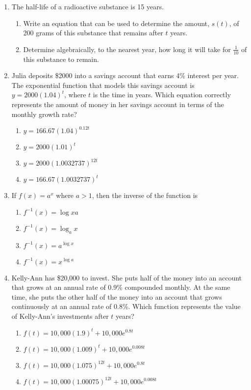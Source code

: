 \documentclass[12pt, twoside]{article}
\begin{document}
\begin{enumerate}[itemsep=0.5cm]
\item The half-life of a radioactive substance is 15 years.
\begin{enumerate}
    \item Write an equation that can be used to determine the amount, \( s(t) \), of 200 grams of this substance that remains after \( t \) years.
    \item Determine algebraically, to the nearest year, how long it will take for \(\frac{1}{10}\) of this substance to remain.
\end{enumerate}

\item Julia deposits \$2000 into a savings account that earns 4\% interest per year. The exponential function that models this savings account is \( y = 2000(1.04)^t \), where \( t \) is the time in years. Which equation correctly represents the amount of money in her savings account in terms of the monthly growth rate?
\begin{enumerate}
    \item \( y = 166.67(1.04)^{0.12t} \)
    \item \( y = 2000(1.01)^t \)
    \item \( y = 2000(1.0032737)^{12t} \)
    \item \( y = 166.67(1.0032737)^t \)
\end{enumerate}

\item If \( f(x) = a^x \) where \( a > 1 \), then the inverse of the function is
\begin{enumerate}
    \item \( f^{-1}(x) = \log x a \)
    \item \( f^{-1}(x) = \log_a x \)
    \item \( f^{-1}(x) = a^{\log x} \)
    \item \( f^{-1}(x) = x^{\log a} \)
\end{enumerate}

\item Kelly-Ann has \$20,000 to invest. She puts half of the money into an account that grows at an annual rate of 0.9\% compounded monthly. At the same time, she puts the other half of the money into an account that grows continuously at an annual rate of 0.8\%. Which function represents the value of Kelly-Ann’s investments after \( t \) years?
\begin{enumerate}
    \item \( f(t) = 10,000(1.9)^t + 10,000e^{0.8t} \)
    \item \( f(t) = 10,000(1.009)^t + 10,000e^{0.008t} \)
    \item \( f(t) = 10,000(1.075)^{12t} + 10,000e^{0.8t} \)
    \item \( f(t) = 10,000(1.00075)^{12t} + 10,000e^{0.008t} \)
\end{enumerate}


\end{enumerate}
\end{document}
